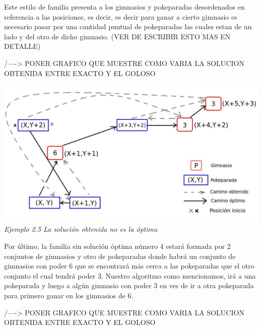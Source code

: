 Este estilo de familia presenta a los gimnasios y pokeparadas desordenados en referencia a las posiciones, es decir, es decir para ganar a cierto gimnasio es necesario pasar por una cantidad puntual de pokeparadas las cuales estan de un lado y del otro de dicho gimnasio.
(VER DE ESCRIBIR ESTO MAS EN DETALLE)

/----> PONER GRAFICO QUE MUESTRE COMO VARIA LA SOLUCION OBTENIDA ENTRE EXACTO Y EL GOLOSO 



\vspace*{0.3cm} \vspace*{0.3cm}
  \begin{center}
\includegraphics[scale=0.60]{./EJ2/nooptima2.jpeg}
\\{\textit{Ejemplo 2.5 La soluci\'on obtenida no es la \'optima}}
  \end{center}
  \vspace*{0.3cm}
  
  
  
Por \'ultimo, la familia sin soluci\'on \'optima n\'umero 4 estar\'a formada por 2 conjuntos de gimnasios y otro de pokeparadas donde habr\'a un conjunto de gimnasios con poder 6 que se encontrar\'a m\'as cerca a las pokeparadas que el otro conjunto el cual tendr\'a poder 3. Nuestro algoritmo como mencionamos, ir\'a a una pokeparada y luego a alg\'un gimnasio con poder 3 en ves de ir a otra pokeparada para primero ganar en los gimnasios de 6.

/----> PONER GRAFICO QUE MUESTRE COMO VARIA LA SOLUCION OBTENIDA ENTRE EXACTO Y EL GOLOSO 

